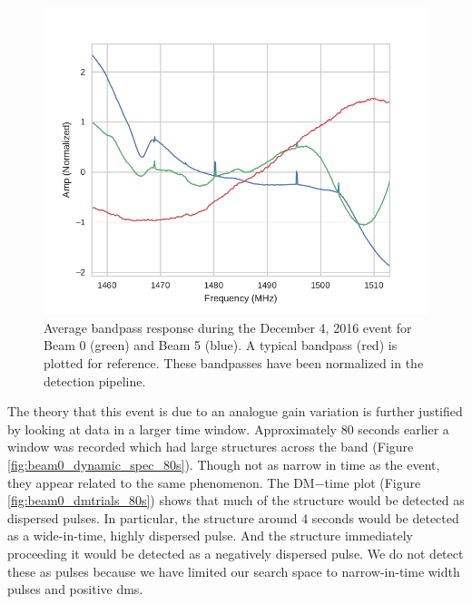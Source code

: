 \documentclass[a4paper,fleqn,usenatbib]{mnras}
\begin{document}
\begin{figure}
    \includegraphics[width=1.0\linewidth]{figures/bandpass_response.pdf}
    \caption{Average bandpass response during the December 4, 2016 event for
    Beam 0 (green) and Beam 5 (blue). A typical bandpass (red) is plotted for
    reference. These bandpasses have been normalized in the detection pipeline.
    }
    \label{fig:bandpass_response}
\end{figure}

The theory that this event is due to an analogue gain variation is further justified
by looking at data in a larger time window.  Approximately 80 seconds earlier a
window was recorded which had large structures across the band (Figure
\ref{fig:beam0_dynamic_spec_80s}). Though not as narrow in time as the event,
they appear related to the same phenomenon.  The DM$-$time plot (Figure
\ref{fig:beam0_dmtrials_80s}) shows that much of the structure would be detected
as dispersed pulses.  In particular, the structure around 4 seconds would be
detected as a wide-in-time, highly dispersed pulse.  And the structure
immediately proceeding it would be detected as a negatively dispersed pulse.  We
do not detect these as pulses because we have limited our search space to
narrow-in-time width pulses and positive \glspl{dm}.
\end{document}
